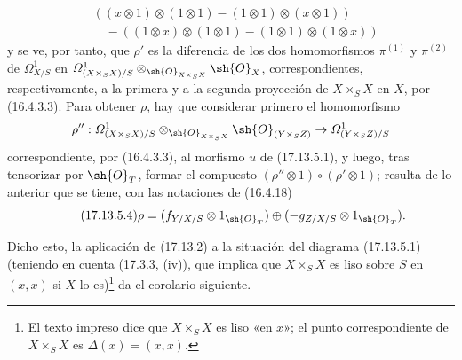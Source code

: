\begin{env}[17.13.5]
\[\begin{split}
&((x\otimes1)\otimes(1\otimes1)-(1\otimes1)\otimes(x\otimes1))\\
&\quad-((1\otimes x)\otimes(1\otimes1)-(1\otimes1)\otimes(1\otimes x))
\end{split}
\]
y se ve, por tanto, que $\rho'$ es la diferencia de los dos homomorfismos $\pi^{(1)}$ y $\pi^{(2)}$ de $\varOmega^1_{X/S}$ en $\varOmega^1_{(X\times_SX)/S}\otimes_{\sh{O}_{X\times_SX}}\sh{O}_X$, correspondientes, respectivamente, a la primera y a la segunda proyección de $X\times_SX$ en $X$, por (16.4.3.3). Para obtener $\rho$, hay que considerar primero el homomorfismo
\[
\rho'':\varOmega^1_{(X\times_SX)/S}\otimes_{\sh{O}_{X\times_SX}}\sh{O}_{(Y\times_SZ)}\to\varOmega^1_{(Y\times_SZ)/S}
\]
correspondiente, por (16.4.3.3), al morfismo $u$ de (17.13.5.1), y luego, tras tensorizar por $\sh{O}_T$, formar el compuesto $(\rho''\otimes1)\circ(\rho'\otimes1)$; resulta de lo anterior que se tiene, con las notaciones de (16.4.18)
\[
\label{IV.17.13.5.4}
\tag{17.13.5.4}
\rho=(f_{Y/X/S}\otimes1_{\sh{O}_T})\oplus(-g_{Z/X/S}\otimes1_{\sh{O}_T}).
\]


Dicho esto, la aplicación de (17.13.2) a la situación del diagrama (17.13.5.1) (teniendo en cuenta (17.3.3, (iv)), que implica que $X\times_SX$ es liso sobre $S$ en $(x,x)$ si $X$ lo es)\footnote{El texto impreso dice que $X\times_SX$ es liso «en $x$»; el punto correspondiente de $X\times_SX$ es $\Delta(x)=(x,x)$.} da el corolario siguiente.
\end{env}

